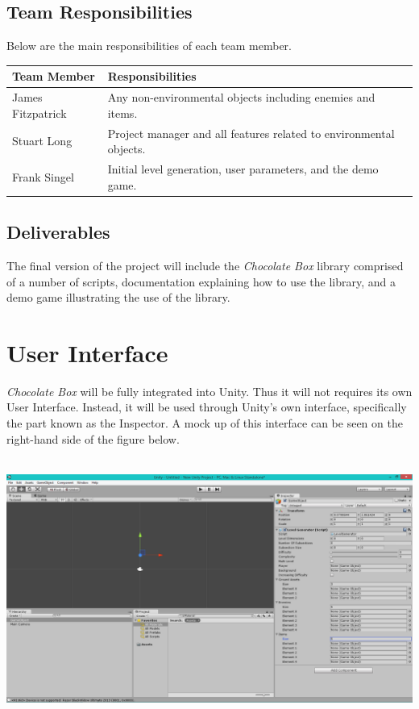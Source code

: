 \documentclass[pdftex,12pt,letter]{article}
\begin{document}
\begin{itemize}
\begin{itemize}
\begin{itemize}
\begin{itemize}
\subsection{Team Responsibilities}
Below are the main responsibilities of each team member.
\begin{table}[!h]
\begin{tabularx}{\textwidth }[t]{|l|Y|}
\hline
\bfseries Team Member & \bfseries Responsibilities\\\hline
James Fitzpatrick & Any non-environmental objects including enemies and items.\\\hline
Stuart Long & Project manager and all features related to environmental objects.\\\hline
Frank Singel & Initial level generation, user parameters, and the demo game.\\\hline
\end{tabularx}
\end{table}
\subsection{Deliverables}
The final version of the project will include the \textit{Chocolate Box} library comprised of a number of scripts, documentation explaining how to use the library, and a demo game illustrating the use of the library.
\FloatBarrier
\section{User Interface}
\textit{Chocolate Box} will be fully integrated into Unity. Thus it will not requires its own User Interface. Instead, it will be used through Unity's own interface, specifically the part known as the Inspector. A mock up of this interface can be seen on the right-hand side of the figure below.\\\\
\centerline{\includegraphics[width=7in]{UnitySS.png}}
\FloatBarrier

\end{itemize}
\end{itemize}
\end{itemize}
\end{itemize}
\end{document}
